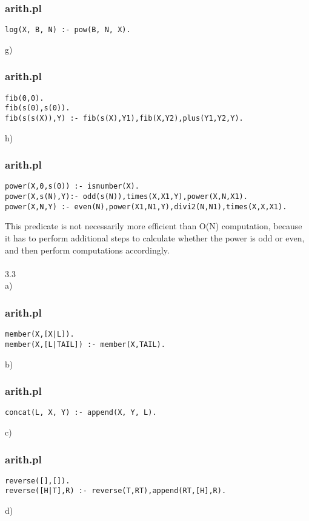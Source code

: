 \documentclass{article}
\begin{document}
\subsubsection*{arith.pl}
\begin{lstlisting} 
log(X, B, N) :- pow(B, N, X).
\end{lstlisting}
g)
\subsubsection*{arith.pl}
\begin{lstlisting} 
fib(0,0).
fib(s(0),s(0)).
fib(s(s(X)),Y) :- fib(s(X),Y1),fib(X,Y2),plus(Y1,Y2,Y).
\end{lstlisting}
h)
\subsubsection*{arith.pl}
\begin{lstlisting} 
power(X,0,s(0)) :- isnumber(X).	
power(X,s(N),Y):- odd(s(N)),times(X,X1,Y),power(X,N,X1).
power(X,N,Y) :- even(N),power(X1,N1,Y),divi2(N,N1),times(X,X,X1).
\end{lstlisting}
This predicate is not necessarily more efficient than O(N) computation, because it has to perform additional steps to calculate whether the power is odd or even, and then perform computations accordingly. \\
\\
3.3
\\
a)
\subsubsection*{arith.pl}
\begin{lstlisting} 
member(X,[X|L]).
member(X,[L|TAIL]) :- member(X,TAIL).
\end{lstlisting}
b)
\subsubsection*{arith.pl}
\begin{lstlisting} 
concat(L, X, Y) :- append(X, Y, L).
\end{lstlisting}
c)
\subsubsection*{arith.pl}
\begin{lstlisting} 
reverse([],[]).
reverse([H|T],R) :- reverse(T,RT),append(RT,[H],R).
\end{lstlisting}
d)
\end{document}
